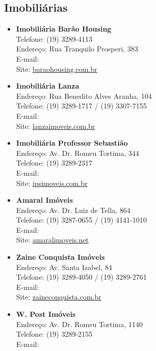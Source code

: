 \subsection{Imobiliárias}

\begin{itemize}
\item   \textbf{Imobiliária Barão Housing}
        \\Telefone: (19) 3289-4113
        \\Endereço: Rua Tranquilo Prosperi, 383
        \\E-mail: 
        \\Site: \url{baraohousing.com.br}

\item   \textbf{Imobiliária Lanza}
		\\Endereço: Rua Benedito Alves Aranha, 104
		\\Telefone: (19) 3289-1717 / (19) 3307-7155
		\\E-mail: 
		\\Site: \url{lanzaimoveis.com.br}

\item   \textbf{Imobiliária Professor Sebastião}
		\\Endereço: Av. Dr. Romeu Tortima, 344
		\\Telefone: (19) 3289-2317
		\\E-mail: 
		\\Site: \url{ipsimoveis.com.br}

\item   \textbf{Amaral Imóveis}
		\\Endereço: Av. Dr. Luiz de Tella, 864
		\\Telefone: (19) 3287-0655 / (19) 4141-1010
		\\E-mail: 
		\\Site: \url{amaralimoveis.net}

\item   \textbf{Zaine Conquista Imóveis}
		\\Endereço: Av. Santa Izabel, 84
		\\Telefone: (19) 3289-4050 / (19) 3289-2761
		\\E-mail: 
		\\Site: \url{zaineconquista.com.br}

\item   \textbf{W. Post Imóveis}
		\\Endereço: Av. Dr. Romeu Tortima, 1140
		\\Telefone: (19) 3289-2155
		\\E-mail: 


\end{itemize}
